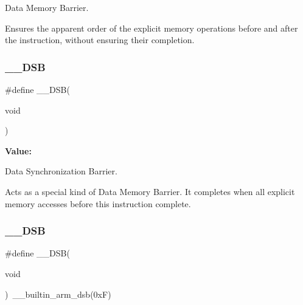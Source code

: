 Data Memory Barrier. 

Ensures the apparent order of the explicit memory operations before and after the instruction, without ensuring their completion. \mbox{\label{group___c_m_s_i_s___core___instruction_interface_ga067d257a2b34565410acefb5afef2203}} 
\subsubsection{\texorpdfstring{\_\_DSB}{\_\_DSB}\hspace{0.1cm}{\footnotesize\ttfamily [1/3]}}
{\footnotesize\ttfamily \#define \+\_\+\+\_\+\+D\+SB(\begin{DoxyParamCaption}\item[{}]{void }\end{DoxyParamCaption})}

{\bfseries Value\+:}
\begin{DoxyCode}{0}
\DoxyCodeLine{\textcolor{keywordflow}{do} \{\(\backslash\)}

\end{DoxyCode}


Data Synchronization Barrier. 

Acts as a special kind of Data Memory Barrier. It completes when all explicit memory accesses before this instruction complete. \mbox{\label{group___c_m_s_i_s___core___instruction_interface_ga067d257a2b34565410acefb5afef2203}} 
\subsubsection{\texorpdfstring{\_\_DSB}{\_\_DSB}\hspace{0.1cm}{\footnotesize\ttfamily [2/3]}}
{\footnotesize\ttfamily \#define \+\_\+\+\_\+\+D\+SB(\begin{DoxyParamCaption}\item[{}]{void }\end{DoxyParamCaption})~\+\_\+\+\_\+builtin\+\_\+arm\+\_\+dsb(0x\+F)}



